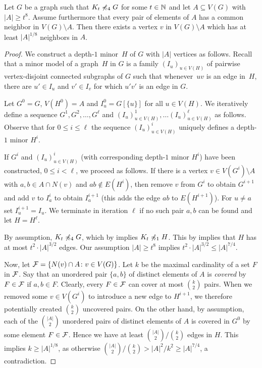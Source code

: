 \begin{lemma}\label{lem:diversity}
  Let $G$ be a graph such that $K_t\not\minor_4G$ for some
  $t\in\N$ and let $A\subseteq V(G)$ with $|A|\geq t^{8}$. 
  Assume furthermore that every pair of elements of $A$ has a common neighbor in $V(G)\setminus A$.
  Then there exists a vertex $v$ in $V(G)\setminus A$ which has at least $|A|^{1/8}$ neighbors in $A$.
\end{lemma}
\begin{proof}
We construct a depth-$1$ 
minor~$H$ of $G$ with $|A|$ vertices as follows. Recall that a 
minor model of a graph~$H$ in $G$ is a family $(I_u)_{u\in V(H)}$ of pairwise vertex-disjoint connected subgraphs of $G$
such that whenever~$uv$ is an edge in~$H$, there 
are $u'\in I_u$ and $v'\in I_v$ for which $u'v'$ 
is an edge in $G$. 

Let $G^0=G$, $V(H^0)=A$ and $I_u^0=G[\{u\}]$ for 
all $u\in V(H)$. We iteratively define a sequence 
$G^1,G^2,\ldots,G^\ell$ and $(I_u)^1_{u\in V(H)},
\ldots (I_u)^\ell_{u\in V(H)}$ as follows. Observe
that for $0\leq i\leq \ell$ the sequence $(I_u)^i_{u\in V(H)}$
uniquely defines a depth-$1$ minor $H^i$. 

If $G^i$ and $(I_u)^i_{u\in V(H)}$ (with corresponding
depth-$1$ minor $H^i$) have been 
constructed, $0\leq i<\ell$, we proceed as follows. 
If there is a vertex $v\in V(G^i)\setminus A$ with 
$a,b\in A \cap N(v)$ and $ab\not\in E(H^i)$, then 
remove $v$ from $G^i$ to obtain $G^{i+1}$ 
and add $v$ to $I_a^i$ to obtain $I_a^{i+1}$ (this 
adds the edge $ab$ to $E(H^{i+1})$). 
For $u\neq a$ set $I_u^{i+1}=I_u$. We terminate
in iteration $\ell$ if no such pair $a,b$ can be found 
and let $H=H^\ell$. 

By assumption, $K_t\not\minor_4 G$, which by 
 implies $K_t\not\minor_1 H$. 
This by  implies that $H$ has at most
$t^2\cdot|A|^{3/2}$ edges. Our assumption $|A|\geq t^8$
implies $t^2\cdot |A|^{3/2}\leq |A|^{7/4}$. 

Now, let ${\cal F}=\set{N(v)\cap A\colon v\in V(G)}$. 
  Let $k$ be the maximal cardinality of a set $F$ in ${\cal F}$.
  Say that an unordered pair $\{a,b\}$ of distinct elements of $A$ is \emph{covered} by $F\in {\cal F}$
  if  $a,b\in F$. Clearly, every $F\in {\cal F}$ can cover at most $\binom{k}{2}$ pairs. When we removed some $v\in V(G^i)$ to
  introduce a new edge to $H^{i+1}$, we therefore potentially
  created $\binom{k}{2}$ uncovered pairs. On the other hand, 
  by assumption, each of the $\binom{|A|}{2}$ unordered pairs of
   distinct elements of $A$ is covered in $G^0$ by some element 
   $F\in {\cal F}$. Hence we have at least 
   $\binom{|A|}{2}/\binom{k}{2}$ edges in $H$. 
   This implies $k\geq |A|^{1/8}$, as otherwise
   $\binom{|A|}{2}/\binom{k}{2}> |A|^2/k^2\geq |A|^{7/4}$,
   a contradiction.
\end{proof}

